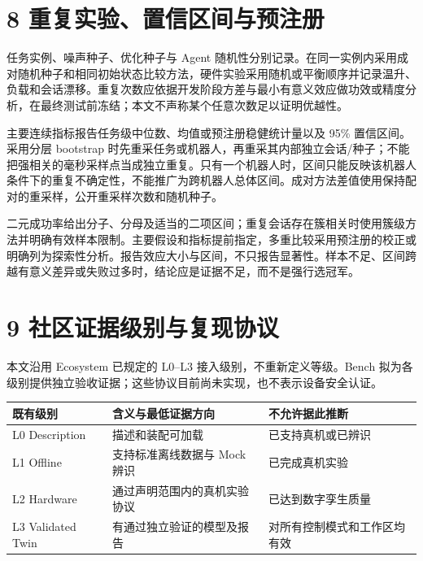 \documentclass[
  chinese,
  11pt,
  a4paper,
  fontset=fandol]{ctexart}
\newcounter{none} %
\begin{document}
\section{8
重复实验、置信区间与预注册}\label{ux91cdux590dux5b9eux9a8cux7f6eux4fe1ux533aux95f4ux4e0eux9884ux6ce8ux518c}

任务实例、噪声种子、优化种子与 Agent
随机性分别记录。在同一实例内采用成对随机种子和相同初始状态比较方法，硬件实验采用随机或平衡顺序并记录温升、负载和会话漂移。重复次数应依据开发阶段方差与最小有意义效应做功效或精度分析，在最终测试前冻结；本文不声称某个任意次数足以证明优越性。

主要连续指标报告任务级中位数、均值或预注册稳健统计量以及 95\%
置信区间。采用分层 bootstrap
时先重采任务或机器人，再重采其内部独立会话/种子；不能把强相关的毫秒采样点当成独立重复。只有一个机器人时，区间只能反映该机器人条件下的重复不确定性，不能推广为跨机器人总体区间。成对方法差值使用保持配对的重采样，公开重采样次数和随机种子。

二元成功率给出分子、分母及适当的二项区间；重复会话存在簇相关时使用簇级方法并明确有效样本限制。主要假设和指标提前指定，多重比较采用预注册的校正或明确列为探索性分析。报告效应大小与区间，不只报告显著性。样本不足、区间跨越有意义差异或失败过多时，结论应是证据不足，而不是强行选冠军。

\section{9
社区证据级别与复现协议}\label{ux793eux533aux8bc1ux636eux7ea7ux522bux4e0eux590dux73b0ux534fux8bae}

本文沿用 Ecosystem 已规定的 L0--L3 接入级别，不重新定义等级。Bench
拟为各级别提供独立验收证据；这些协议目前尚未实现，也不表示设备安全认证。

{\def\LTcaptype{none} %
\begin{longtable}[]{@{}
  >{\raggedright\arraybackslash}p{}
  >{\raggedright\arraybackslash}p{}
  >{\raggedright\arraybackslash}p{}@{}}
\toprule\noalign{}
\begin{minipage}[b]{\linewidth}\raggedright
既有级别
\end{minipage} & \begin{minipage}[b]{\linewidth}\raggedright
含义与最低证据方向
\end{minipage} & \begin{minipage}[b]{\linewidth}\raggedright
不允许据此推断
\end{minipage} \\
\midrule\noalign{}
\endhead
\bottomrule\noalign{}
\endlastfoot
L0 Description & 描述和装配可加载 & 已支持真机或已辨识 \\
L1 Offline & 支持标准离线数据与 Mock 辨识 & 已完成真机实验 \\
L2 Hardware & 通过声明范围内的真机实验协议 & 已达到数字孪生质量 \\
L3 Validated Twin & 有通过独立验证的模型及报告 &
对所有控制模式和工作区均有效 \\
\end{longtable}
}
\end{document}
